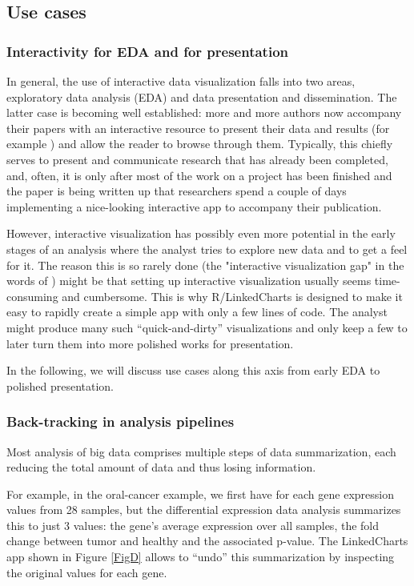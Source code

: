 \documentclass[twocolumn,10pt]{article}
\begin{document}
\subsection{Use cases}

\subsubsection{Interactivity for EDA and for presentation}

In general, the use of interactive data visualization falls into two areas, exploratory data analysis (EDA) and data presentation and dissemination. The latter case is becoming well established: more and more authors now accompany their papers with an interactive resource to present their data and results (for example \citet{travaglini_2020, roider_2020, kalucka_2020}) and allow the reader to browse through them. Typically, this chiefly serves to present and communicate research that has already been completed, and, often, it is only after most of the work on a project has been finished and the paper is being written up that researchers spend a couple of days implementing a nice-looking interactive app to accompany their publication.

However, interactive visualization has possibly even more potential in the early stages of an analysis where the analyst tries to explore new data and to get a feel for it. The reason this is so rarely done (the "interactive visualization gap" in the words of \citet{batch_2017}) might be that setting up interactive visualization usually seems time-consuming and cumbersome. This is why R/LinkedCharts is designed to make it easy to rapidly create a simple app with only a few lines of code. The analyst might produce many such ``quick-and-dirty'' visualizations and only keep a few to later turn them into more polished works for presentation.

In the following, we will discuss use cases along this axis from early EDA to polished presentation.


\subsubsection{Back-tracking in analysis pipelines}

Most analysis of big data comprises multiple steps of data summarization, each reducing the total amount of data and thus losing information.

For example, in the oral-cancer example, we first have for each gene expression values from 28 samples, but the differential expression data analysis summarizes this to just 3 values: the gene's average expression over all samples, the fold change between tumor and healthy and the associated p-value. The LinkedCharts app shown in Figure \ref{FigD} allows to ``undo'' this summarization by inspecting the original values for each gene.
\end{document}
